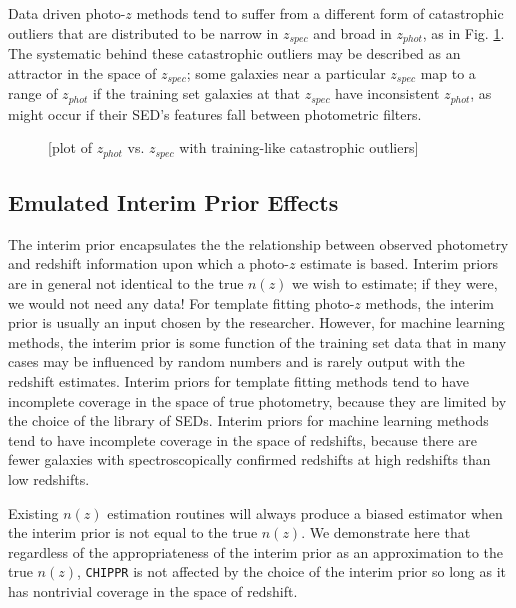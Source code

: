 \documentclass[iop]{emulateapj}
\newcommand{\chippr}{\texttt{CHIPPR} }
\begin{document}
Data driven photo-$z$ methods tend to suffer from a different form of catastrophic outliers that are distributed to be narrow in $z_{spec}$ and broad in $z_{phot}$, as in Fig. \ref{fig:traincatout}.  The systematic behind these catastrophic outliers may be described as an attractor in the space of $z_{spec}$; some galaxies near a particular $z_{spec}$ map to a range of $z_{phot}$ if the training set galaxies at that $z_{spec}$ have inconsistent $z_{phot}$, as might occur if their SED's features fall between photometric filters.

\begin{figure}
	\begin{center}
		\caption{[plot of $z_{phot}$ vs. $z_{spec}$ with training-like catastrophic outliers]}
		\label{fig:traincatout}
	\end{center}
\end{figure}

\subsection{Emulated Interim Prior Effects}
\label{sec:priors}

The interim prior encapsulates the the relationship between observed photometry and redshift information upon which a photo-$z$ estimate is based.  Interim priors are in general not identical to the true $n(z)$ we wish to estimate; if they were, we would not need any data!  For template fitting photo-$z$ methods, the interim prior is usually an input chosen by the researcher.  However, for machine learning methods, the interim prior is some function of the training set data that in many cases may be influenced by random numbers and is rarely output with the redshift estimates.  Interim priors for template fitting methods tend to have incomplete coverage in the space of true photometry, because they are limited by the choice of the library of SEDs.  Interim priors for machine learning methods tend to have incomplete coverage in the space of redshifts, because there are fewer galaxies with spectroscopically confirmed redshifts at high redshifts than low redshifts.

Existing $n(z)$ estimation routines will always produce a biased estimator when the interim prior is not equal to the true $n(z)$.  We demonstrate here that regardless of the appropriateness of the interim prior as an approximation to the true $n(z)$, \chippr is not affected by the choice of the interim prior so long as it has nontrivial coverage in the space of redshift.
\end{document}
